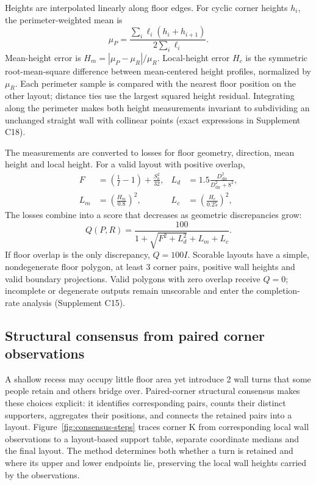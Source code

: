 Heights are interpolated linearly along floor edges. For cyclic corner heights $h_i$, the perimeter-weighted mean is
\begin{equation}
 \mu_P=\frac{\sum_i\ell_i(h_i+h_{i+1})}{2\sum_i\ell_i}.
 \label{eq:perimeter-height}
\end{equation}
Mean-height error is $H_m=|\mu_P-\mu_R|/\mu_R$. Local-height error $H_c$ is the symmetric root-mean-square difference between mean-centered height profiles, normalized by $\mu_R$. Each perimeter sample is compared with the nearest floor position on the other layout; distance ties use the largest squared height residual. Integrating along the perimeter makes both height measurements invariant to subdividing an unchanged straight wall with collinear points (exact expressions in Supplement C18).

The measurements are converted to losses for floor geometry, direction, mean height and local height. For a valid layout with positive overlap,
\begin{align}
 F&=\left(\frac1I-1\right)+\frac{S_b^2}{32}, &
 L_d&=1.5\frac{D_{\mathrm{dir}}^2}{D_{\mathrm{dir}}^2+8^2},\label{eq:floor-loss}\\
 L_m&=\left(\frac{H_m}{0.8}\right)^2, &
 L_c&=\left(\frac{H_c}{0.25}\right)^2,\label{eq:height-loss}
\end{align}
The losses combine into a score that decreases as geometric discrepancies grow:
\begin{equation}
 Q(P,R)=\frac{100}{1+\sqrt{F^2+L_d^2}+L_m+L_c}.\label{eq:quality}
\end{equation}
If floor overlap is the only discrepancy, $Q=100I$. Scorable layouts have a simple, nondegenerate floor polygon, at least 3 corner pairs, positive wall heights and valid boundary projections. Valid polygons with zero overlap receive $Q=0$; incomplete or degenerate outputs remain unscorable and enter the completion-rate analysis (Supplement C15).

\subsection{Structural consensus from paired corner observations}
\label{sec:consensus}

A shallow recess may occupy little floor area yet introduce 2 wall turns that some people retain and others bridge over. Paired-corner structural consensus makes these choices explicit: it identifies corresponding pairs, counts their distinct supporters, aggregates their positions, and connects the retained pairs into a layout. Figure~\ref{fig:consensus-steps} traces corner K from corresponding local wall observations to a layout-based support table, separate coordinate medians and the final layout. The method determines both whether a turn is retained and where its upper and lower endpoints lie, preserving the local wall heights carried by the observations.

